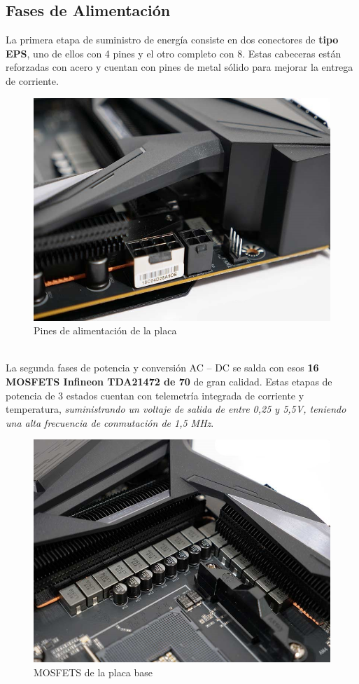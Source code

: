 \documentclass{article}
\begin{document}
    \subsection{Fases de Alimentación}
      La primera etapa de suministro de energía consiste en dos conectores de \textbf{tipo EPS}, uno de ellos con 4 pines y el otro completo con 8. Estas cabeceras están reforzadas con acero y cuentan con pines de metal sólido para mejorar la 
      entrega de corriente.
      \\
      \begin{figure}[h]
        \centering
        \includegraphics[scale=0.35]{img/alimentación1.jpg}
        \caption{Pines de alimentación de la placa}
      \end{figure}
      \\
      La segunda fases de potencia y conversión AC – DC se salda con esos \textbf{16 MOSFETS Infineon TDA21472 de 70} de gran calidad. Estas etapas de potencia de 3 estados 
      cuentan con telemetría integrada de corriente y temperatura, \textit{suministrando un voltaje de salida de entre 0,25 y 5,5V, teniendo una alta frecuencia de conmutación de 1,5 MHz}.
     
      \begin{figure}[h]
        \centering
        \includegraphics[scale=0.35]{img/alimentación2.jpg}
        \caption{MOSFETS de la placa base}
      \end{figure}
\end{document}

